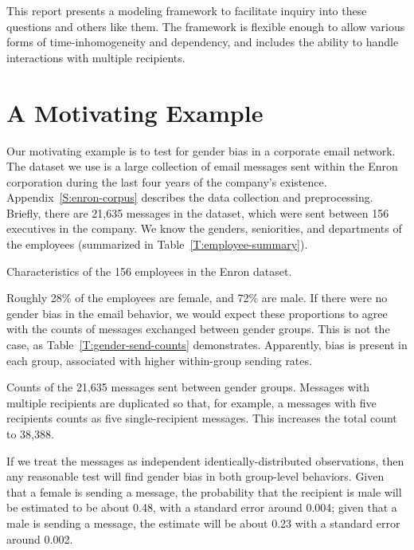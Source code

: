 \documentclass[aoas,preprint]{imsart}
\begin{document}
This report presents a modeling framework to facilitate inquiry into
these questions and others like them. The framework is flexible enough to
allow various forms of time-inhomogeneity and dependency, and includes the
ability to handle interactions with multiple recipients. 


\section{A Motivating Example}

Our motivating example is to test for gender bias in a corporate email
network.  The dataset we use is a large collection of email messages sent
within the Enron corporation during the last four years of the company's
existence.  Appendix~\ref{S:enron-corpus} describes the data collection and
preprocessing.  Briefly, there are 21,635 messages in the dataset, which
were sent between 156 executives in the company.  We know the genders,
seniorities, and departments of the employees (summarized in
Table~\ref{T:employee-summary}).

\begin{table}[h]
    
    \caption{
        Characteristics of the 156 employees in the Enron dataset.
    }
    \label{T:employee-summary}
\end{table}

Roughly 28\% of the employees are female, and 72\% are male.  If there were
no gender bias in the email behavior, we would expect these proportions to
agree with the counts of messages exchanged between gender groups.  This
is not the case, as Table~\ref{T:gender-send-counts} demonstrates.  
Apparently, bias is present in each group, associated with higher
within-group sending rates.

\begin{table}[h]
    
    \caption{
        Counts of the 21,635 messages sent between gender groups.  Messages
        with multiple recipients are duplicated so that, for example,
        a messages with five recipients counts as five single-recipient
        messages.  This increases the total count to 38,388.
    }
    \label{T:gender-send-counts}
\end{table}

If we treat the messages as independent identically-distributed observations,
then any reasonable test will find gender bias in both group-level behaviors.
Given that a female is sending a message, the probability that the recipient
is male will be estimated to be about 0.48, with a standard error around
0.004; given that a male is sending a message, the estimate will be about
0.23 with a standard error around 0.002.
\end{document}
